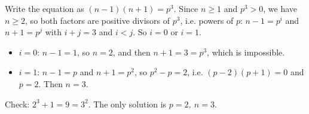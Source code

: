 Write the equation as $(n-1)(n+1)=p^3$. Since $n\ge1$ and $p^3>0$, we have $n\ge2$, so both factors are positive divisors of $p^3$, i.e. powers of $p$: $n-1=p^i$ and $n+1=p^j$ with $i+j=3$ and $i<j$. So $i=0$ or $i=1$.
\begin{itemize}
\item $i=0$: $n-1=1$, so $n=2$, and then $n+1=3=p^3$, which is impossible.
\item $i=1$: $n-1=p$ and $n+1=p^2$, so $p^2-p=2$, i.e. $(p-2)(p+1)=0$ and $p=2$. Then $n=3$.
\end{itemize}
Check: $2^3+1=9=3^2$. The only solution is $\boxed{p=2,\ n=3}$.
